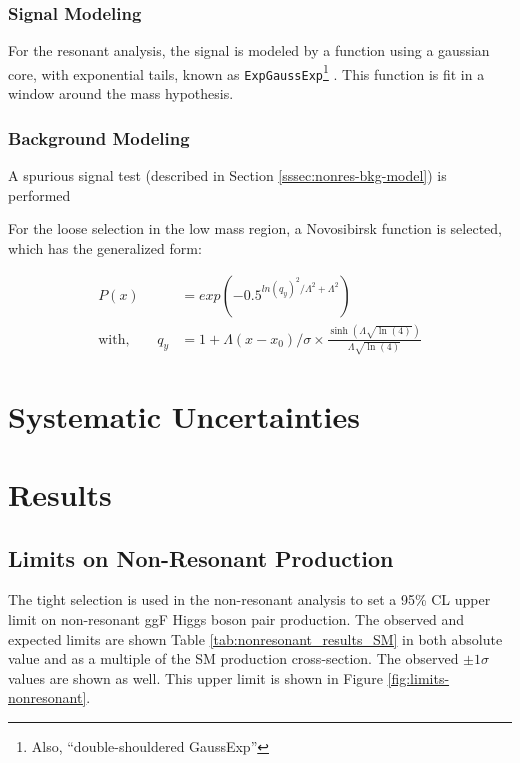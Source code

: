 \subsubsection{Signal Modeling}

For the resonant analysis, the signal is modeled by a function using a gaussian core, with exponential tails, known as \texttt{ExpGaussExp}\footnote{Also, ``double-shouldered GaussExp''} \cite{exp-gauss-exp}. This function is fit in a window around the mass hypothesis. %


\subsubsection{Background Modeling}

A spurious signal test (described in Section \ref{sssec:nonres-bkg-model}) is performed

For the loose selection in the low mass region, a Novosibirsk function \cite{novosibirsk} is selected, which has the generalized form:

\begin{equation}
  \begin{split}
  P(x) &= exp(-0.5^{ln(q_y)^2 / \Lambda^2 + \Lambda^2})\\
  \text{with,} \quad \quad q_{y} &= 1 + \Lambda(x-x_0)/\sigma \times \frac{\sinh(\Lambda \sqrt{\ln(4)})}{\Lambda \sqrt{\ln(4)}}
  \end{split}
\end{equation}

\section{Systematic Uncertainties}
\section{Results}

\subsection{Limits on Non-Resonant Production}

The tight selection is used in the non-resonant analysis to set a 95\% \gls{CL} upper limit on non-resonant \gls{ggF} Higgs boson pair production. The observed and expected limits are shown Table \ref{tab:nonresonant_results_SM} in both absolute value and as a multiple of the \gls{SM} production cross-section. The observed $\pm 1\sigma$ values are shown as well. This upper limit is shown in Figure \ref{fig:limits-nonresonant}.

